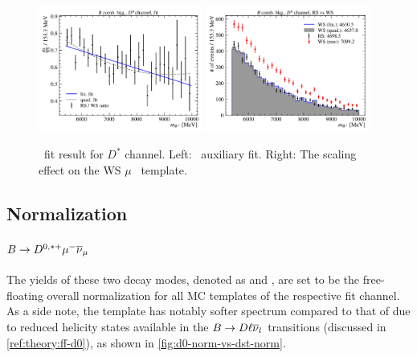 \begin{figure}[!htb]
    \centering
    \includegraphics[width=0.48\textwidth]{figs-fit-fit-templates/data-driven-plots/b_comb/fit_b_comb_d0_fit.pdf}
    \includegraphics[width=0.48\textwidth]{figs-fit-fit-templates/data-driven-plots/b_comb/fit_b_comb_d0_scaled.pdf}

    \caption{
        \BComb\ fit result for $D^*$ channel.
        Left: \BComb\ auxiliary fit.
        Right: The scaling effect on the WS $\mu$ \BComb\ template.
    }
    \label{fig:b-comb-d0}
\end{figure}


\subsection{Normalization}
\label{tmpl:norm}

\paragraph{$B \rightarrow D^{0,*+}{\mu^-}{{\overline{\nu}}_\mu}$}
The yields of these two decay modes,
denoted as \fitNDmu and \fitNmu,
are set to be the free-floating overall normalization for all MC templates of
the respective fit channel.
As a side note,
the \Dz\muon template has notably softer \qSq spectrum compared to
that of \Dstarp\muon due to reduced helicity states available in the
$B \rightarrow D \ell {\ensuremath{{\overline{\nu}}_l}}$ transitions
(discussed in \cref{ref:theory:ff-d0}),
as shown in \cref{fig:d0-norm-vs-dst-norm}.

